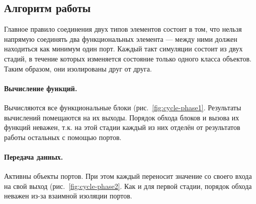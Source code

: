 \subsection{Алгоритм работы}

Главное правило соединения двух типов элементов состоит в том, что нельзя напрямую соединять два функциональных элемента --- между ними должен находиться как минимум один порт. Каждый такт симуляции состоит из двух стадий, в течение которых изменяется состояние только одного класса объектов. Таким образом, они изолированы друг от друга.

\paragraph{Вычисление функций.} Вычисляются все функциональные блоки (рис.~\ref{fig:cycle-phase1}. Результаты вычислений помещаются на их выходы. Порядок обхода блоков и вызова их функций неважен, т.к. на этой стадии каждый из них отделён от результатов работы остальных с помощью портов.

\paragraph{Передача данных.} Активны объекты портов. При этом каждый переносит значение со своего входа на свой выход (рис.~\ref{fig:cycle-phase2}. Как и для первой стадии, порядок обхода неважен из-за взаимной изоляции портов.

